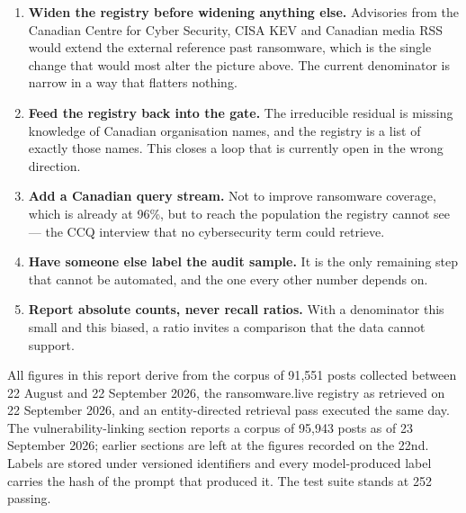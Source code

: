 \documentclass[11pt]{article}
\begin{document}
\begin{enumerate}[leftmargin=1.4em,itemsep=3pt]
\item \textbf{Widen the registry before widening anything else.} Advisories
from the Canadian Centre for Cyber Security, CISA KEV and Canadian media RSS
would extend the external reference past ransomware, which is the single
change that would most alter the picture above. The current denominator is
narrow in a way that flatters nothing.
\item \textbf{Feed the registry back into the gate.} The irreducible residual
is missing knowledge of Canadian organisation names, and the registry is a
list of exactly those names. This closes a loop that is currently open in the
wrong direction.
\item \textbf{Add a Canadian query stream.} Not to improve ransomware
coverage, which is already at 96\%, but to reach the population the registry
cannot see --- the CCQ interview that no cybersecurity term could retrieve.
\item \textbf{Have someone else label the audit sample.} It is the only
remaining step that cannot be automated, and the one every other number
depends on.
\item \textbf{Report absolute counts, never recall ratios.} With a denominator
this small and this biased, a ratio invites a comparison that the data cannot
support.
\end{enumerate}

\vfill
\begin{plainbox}
\footnotesize
All figures in this report derive from the corpus of 91{,}551 posts collected
between 22 August and 22 September 2026, the ransomware.live registry as
retrieved on 22 September 2026, and an entity-directed retrieval pass executed
the same day. The vulnerability-linking section reports a corpus of 95{,}943
posts as of 23 September 2026; earlier sections are left at the figures recorded
on the 22nd.
Labels are stored under versioned identifiers and every model-produced label
carries the hash of the prompt that produced it. The test suite stands at 252
passing.
\end{plainbox}
\end{document}
